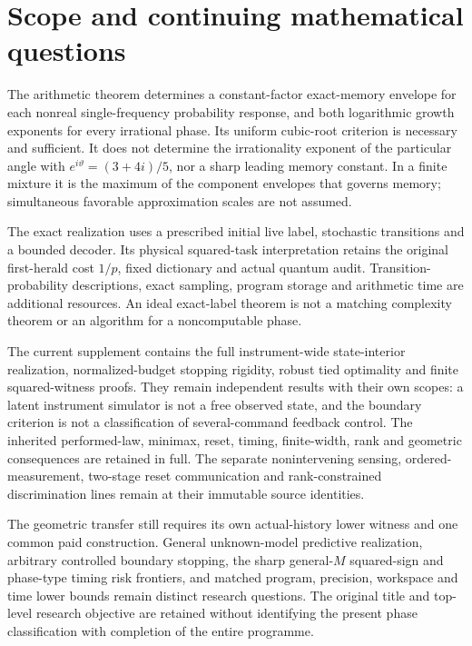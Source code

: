 \section{Scope and continuing mathematical questions}\label{sec:r71-scope}
The arithmetic theorem determines a constant-factor exact-memory envelope for each nonreal single-frequency probability response, and both logarithmic growth exponents for every irrational phase. Its uniform cubic-root criterion is necessary and sufficient. It does not determine the irrationality exponent of the particular angle with $e^{i\vartheta}=(3+4i)/5$, nor a sharp leading memory constant. In a finite mixture it is the maximum of the component envelopes that governs memory; simultaneous favorable approximation scales are not assumed.

The exact realization uses a prescribed initial live label, stochastic transitions and a bounded decoder. Its physical squared-task interpretation retains the original first-herald cost $1/p$, fixed dictionary and actual quantum audit. Transition-probability descriptions, exact sampling, program storage and arithmetic time are additional resources. An ideal exact-label theorem is not a matching complexity theorem or an algorithm for a noncomputable phase.

The current supplement contains the full instrument-wide state-interior realization, normalized-budget stopping rigidity, robust tied optimality and finite squared-witness proofs. They remain independent results with their own scopes: a latent instrument simulator is not a free observed state, and the boundary criterion is not a classification of several-command feedback control. The inherited performed-law, minimax, reset, timing, finite-width, rank and geometric consequences are retained in full. The separate nonintervening sensing, ordered-measurement, two-stage reset communication and rank-constrained discrimination lines remain at their immutable source identities.

The geometric transfer still requires its own actual-history lower witness and one common paid construction. General unknown-model predictive realization, arbitrary controlled boundary stopping, the sharp general-$M$ squared-sign and phase-type timing risk frontiers, and matched program, precision, workspace and time lower bounds remain distinct research questions. The original title and top-level research objective are retained without identifying the present phase classification with completion of the entire programme.


